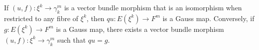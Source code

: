 If $(u, f): \xi^k \rightarrow \gamma_k^m$ is a vector bundle morphism that is an isomorphism when restricted to any fibre of $\xi^k$, then $q u: E(\xi^k) \rightarrow F^m$ is a Gauss map. Conversely, if $g: E(\xi^k) \rightarrow F^m$ is a Gauss map, there exists a vector bundle morphism $(u, f): \xi^k \rightarrow \gamma_k^m$ such that $q u = g$.
